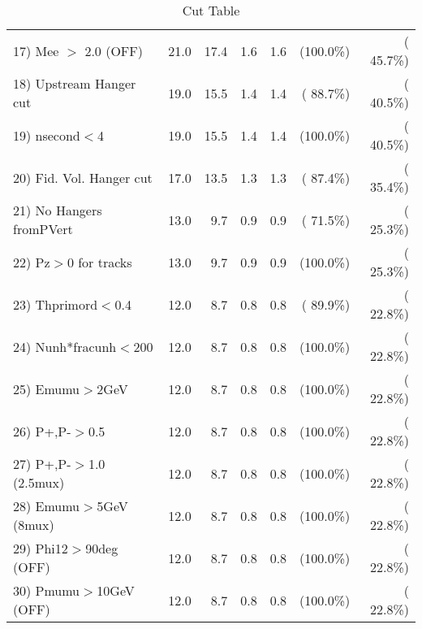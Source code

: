 \begin{table}[h!]
\begin{tabular}{||l||r|r|r|r|r|r||}
 17) Mee $>$ 2.0  (OFF)   &         21.0 &         17.4 &          1.6 &          1.6 & (100.0\%) & ( 45.7\%) \\
 18) Upstream Hanger cut  &         19.0 &         15.5 &          1.4 &          1.4 & ( 88.7\%) & ( 40.5\%) \\
 19) nsecond$<$4          &         19.0 &         15.5 &          1.4 &          1.4 & (100.0\%) & ( 40.5\%) \\
 20) Fid. Vol. Hanger cut &         17.0 &         13.5 &          1.3 &          1.3 & ( 87.4\%) & ( 35.4\%) \\
 21) No Hangers fromPVert &         13.0 &          9.7 &          0.9 &          0.9 & ( 71.5\%) & ( 25.3\%) \\
 22) Pz$>$0 for tracks    &         13.0 &          9.7 &          0.9 &          0.9 & (100.0\%) & ( 25.3\%) \\
 23) Thprimord$<$0.4      &         12.0 &          8.7 &          0.8 &          0.8 & ( 89.9\%) & ( 22.8\%) \\
 24) Nunh*fracunh$<$200   &         12.0 &          8.7 &          0.8 &          0.8 & (100.0\%) & ( 22.8\%) \\
 25) Emumu$>$2GeV         &         12.0 &          8.7 &          0.8 &          0.8 & (100.0\%) & ( 22.8\%) \\
 26) P+,P-$>$0.5          &         12.0 &          8.7 &          0.8 &          0.8 & (100.0\%) & ( 22.8\%) \\
 27) P+,P-$>$1.0 (2.5mux) &         12.0 &          8.7 &          0.8 &          0.8 & (100.0\%) & ( 22.8\%) \\
 28) Emumu$>$5GeV  (8mux) &         12.0 &          8.7 &          0.8 &          0.8 & (100.0\%) & ( 22.8\%) \\
 29) Phi12$>$90deg  (OFF) &         12.0 &          8.7 &          0.8 &          0.8 & (100.0\%) & ( 22.8\%) \\
 30) Pmumu$>$10GeV  (OFF) &         12.0 &          8.7 &          0.8 &          0.8 & (100.0\%) & ( 22.8\%) \\
 \hline
 \hline
 \end{tabular}
 \caption{Cut Table           }
 \label{tab-cutcohjpsi-mumu_anumucc}
 \end{table}
